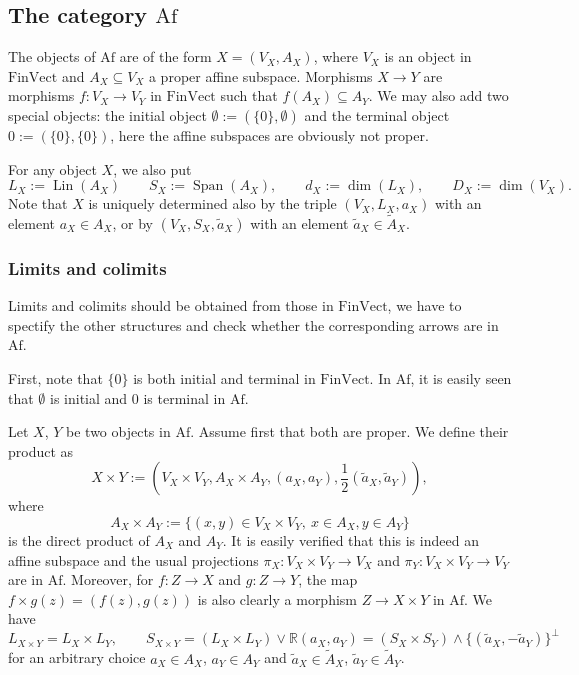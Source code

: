 \documentclass[12pt]{article}
\theoremstyle{definition}
\theoremstyle{remark}
\def\lin{\operatorname{Lin}}
\def\Span{\operatorname{Span}}
\def \Af{\mathrm{Af}}
\def \FV{\mathrm{FinVect}}
\def\bX{ X}
\def\bY{ Y}
\def\bZ{Z}
\begin{document}
\subsection{The category $\Af$}


The objects of $\Af$ are of the form $X=(V_X,A_X)$, where $V_X$ is an object in 
$\FV$ and  $A_X\subseteq V_X$ a proper affine subspace. Morphisms $X\to Y$ are morphisms
$f:V_X\to V_Y$ in $\FV$ such that
$f(A_X)\subseteq A_Y$.  We may
also add
two special objects: the initial object $\emptyset:=(\{0\}, \emptyset)$ and the terminal
object $0:=(\{0\},\{0\})$, here the affine subspaces are obviously not proper.


For any object $X$, we also put 
\[
L_X:=\lin(A_X)\qquad S_X:=\Span(A_X),\qquad  d_X:=\dim(L_X),\qquad D_X:=\dim(V_X).
\]
Note that $X$ is
uniquely determined also by the triple $(V_X,L_X,a_X)$ with  an element $a_X\in A_X$, or
by $(V_X,S_X,\tilde a_X)$ with an element $\tilde a_X\in \tilde A_X$. 




\subsubsection{Limits and colimits}

Limits and colimits should be obtained from those in $\FV$, we have to spectify the other
structures and check  whether the corresponding arrows are in $\Af$. 

\medskip

First, note that $\{0\}$ is both initial and terminal in $\FV$. In $\Af$, it is easily
seen that $\emptyset$ is {initial} and $0$ is {terminal} in $\Af$. 

Let $\bX$, $\bY$ be two objects in $\Af$. Assume first that both are proper. We define
their {product} as
\[
\bX\times \bY:=(V_\bX\times V_\bY, A_\bX\times A_\bY, (a_X,a_Y), \frac12(\tilde a_X,\tilde
a_Y)),
\]
where 
\[
A_\bX\times A_\bY:=\{(x,y)\in V_\bX\times V_\bY,\ x\in A_\bX, y\in A_\bY\}
\]
is the direct product of $A_\bX$ and $A_\bY$. It is easily verified that this is indeed an
affine subspace and the usual projections $\pi_\bX:V_\bX\times V_\bY\to V_\bX$ and $\pi_\bY:V_\bX\times
V_\bY\to V_\bY$ are in $\Af$. Moreover, for $f:\bZ\to \bX$  and $g:\bZ\to \bY$, the map
$f\times g(z)=(f(z),g(z))$ is also clearly a morphism $\bZ\to \bX\times\bY$  in $\Af$. 
We have
\[
L_{X\times Y}=L_X\times L_Y,\qquad S_{X\times Y}= (L_X\times L_Y)\vee \mathbb R(a_X,a_Y)=(S_X\times S_Y)\wedge \{(\tilde
a_X,-\tilde a_Y)\}^\perp
\]
for an arbitrary choice $a_X\in A_X$, $a_Y\in A_Y$ and $\tilde a_X\in \tilde A_X$, $\tilde
a_Y\in \tilde A_Y$.
\end{document}
